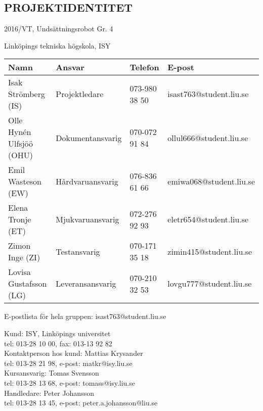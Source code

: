 \documentclass[11pt]{article}
\begin{document}
\pagebreak
\begin{center}

\section*{PROJEKTIDENTITET}
2016/VT, Undsättningsrobot Gr. 4

Linköpings tekniska högskola, ISY
\vspace{5em}
\begin{center}

\begin{tabular}{|l|l|l|l|} \hline
\textbf{Namn} & \textbf{Ansvar} & \textbf{Telefon} & \textbf{E-post}  \\ \hline 
Isak Strömberg (IS) & Projektledare & 073-980 38 50 & isast763@student.liu.se \\ \hline
Olle Hynén Ulfsjöö (OHU)& Dokumentansvarig & 070-072 91 84 & ollul666@student.liu.se \\ \hline
Emil Wasteson (EW) & Hårdvaruansvarig & 076-836 61 66 & emiwa068@student.liu.se \\ \hline
Elena Tronje (ET) & Mjukvaruansvarig & 072-276 92 93 & eletr654@student.liu.se \\ \hline
Zimon Inge (ZI)& Testansvarig & 070-171 35 18 & zimin415@student.liu.se \\ \hline
Lovisa Gustafsson (LG) & Leveransansvarig & 070-210 32 53 & lovgu777@student.liu.se \\ \hline
\end{tabular}

\end{center}

E-postlista för hela gruppen: isast763@student.liu.se

\vspace{5em}
Kund: ISY, Linköpings universitet \\
tel: 013-28 10 00, fax: 013-13 92 82 \\
Kontaktperson hos kund: Mattias Krysander \\
tel: 013-28 21 98, e-post: matkr@isy.liu.se \\

\vspace{5em}
Kursansvarig:  Tomas Svensson\\
tel: 013-28 13 68, e-post: tomass@isy.liu.se \\
Handledare: Peter Johansson \\
tel: 013-28 13 45, e-post: peter.a.johansson@liu.se
\end{center}
\pagebreak
\end{document}
